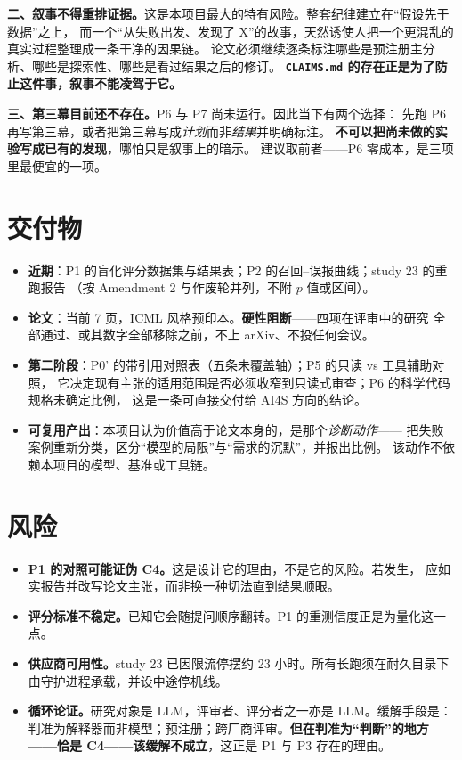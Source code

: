 \documentclass[11pt,a4paper]{article}
\begin{document}
\textbf{二、叙事不得重排证据。}这是本项目最大的特有风险。整套纪律建立在“假设先于数据”之上，
而一个“从失败出发、发现了 X”的故事，天然诱使人把一个更混乱的真实过程整理成一条干净的因果链。
论文必须继续逐条标注哪些是预注册主分析、哪些是探索性、哪些是看过结果之后的修订。
\textbf{\texttt{CLAIMS.md} 的存在正是为了防止这件事，叙事不能凌驾于它。}

\textbf{三、第三幕目前还不存在。}P6 与 P7 尚未运行。因此当下有两个选择：
先跑 P6 再写第三幕，或者把第三幕写成\emph{计划}而非\emph{结果}并明确标注。
\textbf{不可以把尚未做的实验写成已有的发现}，哪怕只是叙事上的暗示。
建议取前者——P6 零成本，是三项里最便宜的一项。

\section{交付物}

\begin{itemize}
\item \textbf{近期}：P1 的盲化评分数据集与结果表；P2 的召回--误报曲线；study 23 的重跑报告
      （按 Amendment 2 与作废轮并列，不附 $p$ 值或区间）。
\item \textbf{论文}：当前 7 页，ICML 风格预印本。\textbf{硬性阻断}——四项在评审中的研究
      全部通过、或其数字全部移除之前，不上 arXiv、不投任何会议。
\item \textbf{第二阶段}：P0' 的带引用对照表（五条未覆盖轴）；P5 的只读 vs 工具辅助对照，
      它决定现有主张的适用范围是否必须收窄到只读式审查；P6 的科学代码规格未确定比例，
      这是一条可直接交付给 AI4S 方向的结论。
\item \textbf{可复用产出}：本项目认为价值高于论文本身的，是那个\emph{诊断动作}——
      把失败案例重新分类，区分“模型的局限”与“需求的沉默”，并报出比例。
      该动作不依赖本项目的模型、基准或工具链。
\end{itemize}

\section{风险}

\begin{itemize}
\item \textbf{P1 的对照可能证伪 C4。}这是设计它的理由，不是它的风险。若发生，
      应如实报告并改写论文主张，而非换一种切法直到结果顺眼。
\item \textbf{评分标准不稳定。}已知它会随提问顺序翻转。P1 的重测信度正是为量化这一点。
\item \textbf{供应商可用性。}study 23 已因限流停摆约 23 小时。所有长跑须在耐久目录下
      由守护进程承载，并设中途停机线。
\item \textbf{循环论证。}研究对象是 LLM，评审者、评分者之一亦是 LLM。缓解手段是：
      判准为解释器而非模型；预注册；跨厂商评审。\textbf{但在判准为“判断”的地方——恰是
      C4——该缓解不成立}，这正是 P1 与 P3 存在的理由。
\end{itemize}
\end{document}
